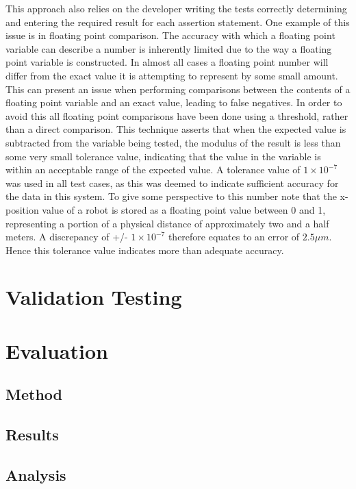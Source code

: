 This approach also relies on the developer writing the tests correctly determining and entering the required result for each assertion statement. One example of this issue is in floating point comparison. The accuracy with which a floating point variable can describe a number is inherently limited due to the way a floating point variable is constructed. In almost all cases a floating point number will differ from the exact value it is attempting to represent by some small amount. This can present an issue when performing comparisons between the contents of a floating point variable and an exact value, leading to false negatives. In order to avoid this all floating point comparisons have been done using a threshold, rather than a direct comparison. This technique asserts that when the expected value is subtracted from the variable being tested, the modulus of the result is less than some very small tolerance value, indicating that the value in the variable is within an acceptable range of the expected value. A tolerance value of $ 1 \times 10^{-7} $ was used in all test cases, as this was deemed to indicate sufficient accuracy for the data in this system. To give some perspective to this number note that the x-position value of a robot is stored as a floating point value between 0 and 1, representing a portion of a physical distance of approximately two and a half meters. A discrepancy of +/- $  1 \times 10^{-7} $ therefore equates to an error of $ 2.5 \mu m $. Hence this tolerance value indicates more than adequate accuracy.


\section{Validation Testing} \label{VerificationTesting}



\section{Evaluation} \label{Evaluation}

\subsection{Method}
\subsection{Results}
\subsection{Analysis}

